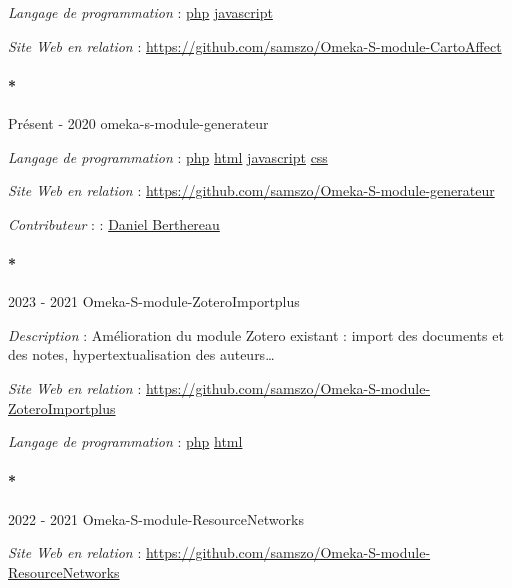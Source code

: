 \documentclass[
  a4paper,
  DIV=11,
  numbers=noendperiod]{scrreprt}
\let\oldparagraph\paragraph
\renewcommand{\paragraph}[1]{\oldparagraph{#1}\mbox{}}
\begin{document}
\emph{Langage de programmation} :
\href{http://localhost/samszo/omk/s/fiches/item/108369}{php}
\href{http://localhost/samszo/omk/s/fiches/item/89711}{javascript}

\emph{Site Web en relation} :
\url{https://github.com/samszo/Omeka-S-module-CartoAffect}

\paragraph*{Présent - 2020
omeka-s-module-generateur}\label{sec-item299719}

\emph{Langage de programmation} :
\href{http://localhost/samszo/omk/s/fiches/item/108369}{php}
\href{http://localhost/samszo/omk/s/fiches/item/96621}{html}
\href{http://localhost/samszo/omk/s/fiches/item/89711}{javascript}
\href{http://localhost/samszo/omk/s/fiches/item/102418}{css}

\emph{Site Web en relation} :
\url{https://github.com/samszo/Omeka-S-module-generateur}

\emph{Contributeur} : :
\href{http://localhost/samszo/omk/s/fiches/item/299623}{Daniel
Berthereau}

\paragraph*{2023 - 2021
Omeka-S-module-ZoteroImportplus}\label{sec-item301850}

\emph{Description} : Amélioration du module Zotero existant : import des
documents et des notes, hypertextualisation des auteurs\ldots{}

\emph{Site Web en relation} :
\url{https://github.com/samszo/Omeka-S-module-ZoteroImportplus}

\emph{Langage de programmation} :
\href{http://localhost/samszo/omk/s/fiches/item/108369}{php}
\href{http://localhost/samszo/omk/s/fiches/item/96621}{html}

\paragraph*{2022 - 2021
Omeka-S-module-ResourceNetworks}\label{omeka-s-module-resourcenetworks}

\emph{Site Web en relation} :
\url{https://github.com/samszo/Omeka-S-module-ResourceNetworks}
\end{document}
